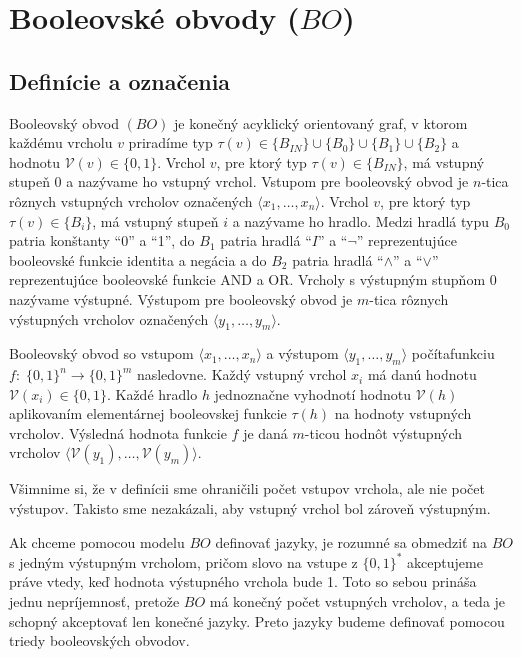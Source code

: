 \chapter{Booleovské obvody ($BO$)}

\section{Definície a označenia}

\begin{definicia}
Booleovský obvod $(BO)$ je konečný acyklický orientovaný graf, v
ktorom každému vrcholu $v$ priradíme typ $\tau (v)\in \{
B_{IN}\}\cup\{ B_0\}\cup\{ B_1\}\cup\{ B_2\}$ a hodnotu
$\mathcal{V}(v)\in\{ 0,1\}$. Vrchol $v$, pre ktorý typ $\tau
(v)\in\{ B_{IN}\}$, má vstupný stupeň 0 a nazývame ho vstupný
vrchol. Vstupom pre booleovský obvod je $n$-tica rôznych vstupných
vrcholov označených $\langle x_1,\dots ,x_n\rangle$. Vrchol $v$,
pre ktorý typ $\tau (v)\in\{ B_i\}$, má vstupný stupeň $i$ a
nazývame ho hradlo. Medzi hradlá typu $B_0$ patria konštanty ``0''
a ``1'', do $B_1$ patria hradlá ``$I$'' a ``$\neg$''
reprezentujúce booleovské funkcie identita a negácia a do $B_2$
patria hradlá ``$\wedge$'' a ``$\vee$'' reprezentujúce booleovské
funkcie AND a OR. Vrcholy s výstupným stupňom 0 nazývame výstupné.
Výstupom pre booleovský obvod je $m$-tica rôznych výstupných
vrcholov označených $\langle y_1,\dots ,y_m\rangle$.
\end{definicia}

\begin{definicia}
Booleovský obvod so vstupom $\langle x_1,\dots ,x_n\rangle$ a
výstupom $\langle y_1,\dots ,y_m\rangle$ počíta\linebreak funkciu
$f:\;\{ 0,1\}^n\rightarrow \{ 0,1\}^m$ nasledovne. Každý vstupný
vrchol $x_i$ má danú hodnotu\linebreak $\mathcal{V}(x_i)\in\{
0,1\}$. Každé hradlo $h$ jednoznačne vyhodnotí hodnotu
$\mathcal{V}(h)$ aplikovaním elementárnej booleovskej funkcie
$\tau (h)$ na hodnoty vstupných vrcholov. Výsledná hodnota funkcie
$f$ je daná $m$-ticou hodnôt výstupných vrcholov $\langle
\mathcal{V}(y_1),\dots ,\mathcal{V}(y_m)\rangle$.
\end{definicia}

Všimnime si, že v definícii sme ohraničili počet vstupov vrchola,
ale nie počet výstupov. Takisto sme nezakázali, aby vstupný vrchol
bol zároveň výstupným.

Ak chceme pomocou modelu $BO$ definovať jazyky, je rozumné sa
obmedziť na $BO$ s jedným výstupným vrcholom, pričom slovo na
vstupe z $\{ 0,1\}^*$ akceptujeme práve vtedy, keď hodnota
výstupného vrchola bude 1. Toto so sebou prináša jednu
nepríjemnosť, pretože $BO$ má konečný počet vstupných vrcholov, a
teda je schopný akceptovať len konečné jazyky. Preto jazyky budeme
definovať pomocou triedy booleovských obvodov.

